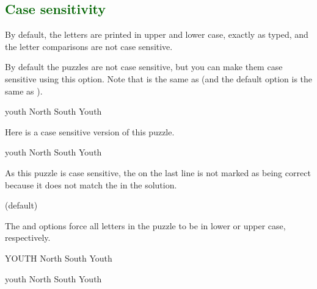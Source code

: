\documentclass[svgnames]{report}
\newcommand\Section[1]{\subsection{\textcolor{DarkGreen}{#1}}}
\begin{document}
  \Section{Case sensitivity}

  By default, the letters are printed in upper and lower case, exactly
  as typed, and the letter comparisons are not case sensitive.


  By default the  puzzles are not case sensitive, but
  you can make them case sensitive using this option. Note that
   is the same as 
  (and the default option is the same as
  ).

  \begin{example}
  \begin{wordle}[case sensitive=false]{youth} %
    North
    South
    Youth
  \end{wordle}
  \end{example}

  Here is a case sensitive version of this puzzle.

  \begin{example}
  \begin{wordle}{youth}
    North
    South
    Youth
  \end{wordle}
  \end{example}

  As this puzzle is case sensitive, the  on the last line is
  not marked as being correct because it does not match the 
  in the solution.

   (default) \qquad
   \qquad

  The  and  options force all
  letters in the puzzle to be in lower or upper case, respectively.

  \begin{example}
  \begin{wordle}{YOUTH}
    North
    South
    Youth
  \end{wordle}
  \end{example}

  \begin{example}
  \begin{wordle}{youth}
    North
    South
    Youth
  \end{wordle}
  \end{example}
\end{document}
